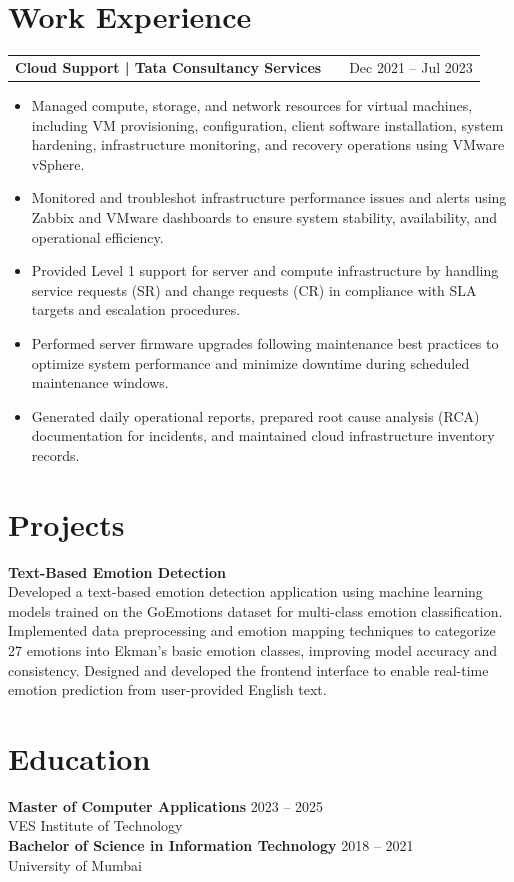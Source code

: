 \documentclass[a4paper,12pt]{article}
\makeatletter
\newenvironment{joblong}[2]
    {
    \begin{tabularx}{\linewidth}{@{}l X r@{}}
    \textbf{#1} & \hfill &  #2 \\[3.75pt]
    \end{tabularx}
    \begin{minipage}[t]{\linewidth}
    \begin{itemize}[nosep,after=\strut, leftmargin=1em, itemsep=3pt,label=\textbullet]
    }
    {
    \end{itemize}
    \end{minipage}    
    }
\makeatother
\begin{document}
\section{Work Experience}
\begin{joblong}{Cloud Support | Tata Consultancy Services}{Dec 2021 -- Jul 2023}
\item Managed compute, storage, and network resources for virtual machines, including VM provisioning, configuration, client software installation, system hardening, infrastructure monitoring, and recovery operations using VMware vSphere.
\item Monitored and troubleshot infrastructure performance issues and alerts using Zabbix and VMware dashboards to ensure system stability, availability, and operational efficiency.
\item Provided Level 1 support for server and compute infrastructure by handling service requests (SR) and change requests (CR) in compliance with SLA targets and escalation procedures.
\item Performed server firmware upgrades following maintenance best practices to optimize system performance and minimize downtime during scheduled maintenance windows.
\item Generated daily operational reports, prepared root cause analysis (RCA) documentation for incidents, and maintained cloud infrastructure inventory records.
\end{joblong}
\section{Projects}
\noindent\textbf{Text-Based Emotion Detection} \\[3.75pt]
Developed a text-based emotion detection application using machine learning models trained on the GoEmotions dataset for multi-class emotion classification. Implemented data preprocessing and emotion mapping techniques to categorize 27 emotions into Ekman’s basic emotion classes, improving model accuracy and consistency. Designed and developed the frontend interface to enable real-time emotion prediction from user-provided English text.
\section{Education}
\noindent\textbf{Master of Computer Applications} \hfill 2023 -- 2025 \\
VES Institute of Technology \\[0.25cm]
\noindent\textbf{Bachelor of Science in Information Technology} \hfill 2018 -- 2021 \\
University of Mumbai
\end{document}
